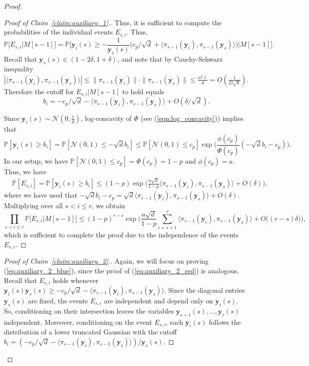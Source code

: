 \documentclass[11pt]{amsart}
\theoremstyle{definition}
\def\cN{\mathcal{N}}
\def\Pb{\mathbb{P}}
\def\by{\boldsymbol{y}}
\begin{document}
\begin{proof}
\begin{proof}[Proof of Claim~\ref{claim:auxiliary_1}.]
Thus, it is sufficient to compute the probabilities of the individual events $E_{s, i}$. Thus,
{\smaller[0.3]
\[\Pb\big[E_{s, i}|M[s\!-\!1]\big]=\Pb\bigg[\by_i(s)\geq -\frac{1}{\by_s(s)}\Big(c_p/\sqrt{d}\!+\!\langle \pi_{s-\!1}(\by_i), \pi_{s-\!1}(\by_s)\rangle\Big)\bigg| M[s\!-\!1]\bigg].\]
}
Recall that $\by_s(s)\in (1-2\delta, 1+\delta)$, and note that by Cauchy-Schwarz inequality
$|\langle \pi_{s-1}(\by_i), \pi_{s-1}(\by_s)\rangle|\leq \|\pi_{s-1}(\by_i)\|\cdot \|\pi_{s-1}(\by_s)\|\leq \frac{\alpha^2 \ell}{d}=O(\frac{1}{D\sqrt{d}})$. Therefore the cutoff for $E_{s, i}| M[s\!-\!1]$ to hold equals 
$$b_i=-c_p/\sqrt{d}-\langle \pi_{s-1}(\by_i), \pi_{s-1}(\by_s)\rangle+O(\delta/{\sqrt{d}}).$$ 

Since $\by_i(s)\sim \cN(0, \frac{1}{d})$, log-concavity of $\Phi$ (see (\ref{eqn:log_concavity})) implies that
{\smaller[0.3]
\[\Pb[\by_i(s)\geq b_i]=\Pb[\cN(0, 1)\leq -\sqrt{d}b_i]\leq \Pb[\cN(0, 1)\leq c_p]\exp\Big(\frac{\phi(c_p)}{\Phi(c_p)}(-\sqrt{d}b_i\!-\!c_p)\Big).\]
}
In our setup, we have $\Pb[\cN(0, 1)\leq c_p]=\Phi(c_p)=1-p$ and $\phi(c_p)=a$. Thus, we have
{\smaller[0.3]
\begin{align*}
&\Pb[E_{s, i}]=\Pb[\by_i(s)\geq b_i]\leq (1\!-\!p)\exp\Big(\frac{a\sqrt{d}}{1\!-\!p}\langle \pi_{s-1}(\by_i), \pi_{s-1}(\by_s)\rangle\!+\!O(\delta)\Big),
\end{align*}
}
where we have used that $-\sqrt{d}b_i-c_p=\sqrt{d}\langle \pi_{s-1}(\by_i), \pi_{s-1}(\by_s)\rangle+O(\delta)$. Multiplying over all $s< i\leq r$, we obtain
{\smaller[0.3]
\[\prod_{s<i\leq r}\Pb\Big[E_{s, i}\Big|M[s\!-\!1]\Big]\leq (1\!-\!p)^{r-s}\exp\bigg(\frac{a\sqrt{d}}{1\!-\!p}\sum_{i=s+1}^r \langle \pi_{s-1}(\by_i), \pi_{s-1}(\by_s)\rangle\!+\!O\big((r\!-\!s)\delta\big)\bigg),\]
}
which is sufficient to complete the proof due to the independence of the events $E_{s, i}$.
\end{proof}

\begin{proof}[Proof of Claim~\ref{claim:auxiliary_2}.]
Again, we will focus on proving (\ref{eq:auxiliary_2_blue}), since the proof of (\ref{eq:auxiliary_2_red}) is analogous. Recall that $E_{s, i}$ holds whenever $\by_i(s)\by_s(s)\geq -c_p/\sqrt{d}-\langle \pi_{s-1}(\by_i), \pi_{s-1}(\by_s)\rangle$. Since the diagonal entries $\by_s(s)$ are fixed, the events $E_{s, i}$ are independent and depend only on $\by_i(s)$. So, conditioning on their intersection leaves the variables $\by_{s+1}(s), \dots, \by_{r}(s)$ independent. Moreover, conditioning on the event $E_{s, i}$, each $\by_i(s)$ follows the distribution of a lower truncated Gaussian with the cutoff $b_i=(-c_p/\sqrt{d}-\langle \pi_{s-1}(\by_i), \pi_{s-1}(\by_s)\rangle)/\by_s(s)$.


\end{proof}
\end{proof}
\end{document}
